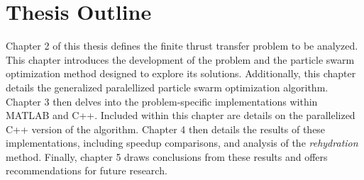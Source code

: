 \section{Thesis Outline}

\noindent Chapter 2 of this thesis defines the finite thrust transfer problem to be analyzed. This chapter introduces the development of the problem
and the particle swarm optimization method designed to explore its solutions. Additionally, this chapter details the generalized paralellized particle swarm optimization algorithm.
Chapter 3 then delves into the problem-specific implementations within MATLAB and C++. Included within
this chapter are details on the parallelized C++ version of the algorithm. 
Chapter 4 then details the results of these implementations, including speedup comparisons, and analysis of the \textit{rehydration} method.
Finally, chapter 5 draws conclusions from these results and offers recommendations for future research. 